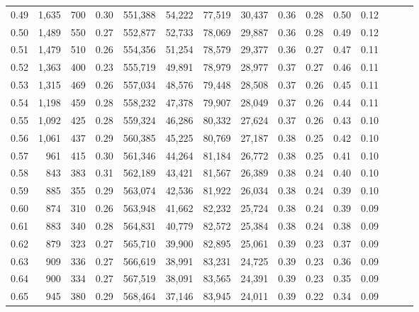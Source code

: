 \begin{tabular}{rrrrrrrrrrrrrrr}
0.49 &   1,635 &    700 &  0.30 &  551,388 &   54,222 &   77,519 &   30,437 &  0.36 &  0.28 &  0.50 &      0.12 \\
0.50 &   1,489 &    550 &  0.27 &  552,877 &   52,733 &   78,069 &   29,887 &  0.36 &  0.28 &  0.49 &      0.12 \\
0.51 &   1,479 &    510 &  0.26 &  554,356 &   51,254 &   78,579 &   29,377 &  0.36 &  0.27 &  0.47 &      0.11 \\
0.52 &   1,363 &    400 &  0.23 &  555,719 &   49,891 &   78,979 &   28,977 &  0.37 &  0.27 &  0.46 &      0.11 \\
0.53 &   1,315 &    469 &  0.26 &  557,034 &   48,576 &   79,448 &   28,508 &  0.37 &  0.26 &  0.45 &      0.11 \\
0.54 &   1,198 &    459 &  0.28 &  558,232 &   47,378 &   79,907 &   28,049 &  0.37 &  0.26 &  0.44 &      0.11 \\
0.55 &   1,092 &    425 &  0.28 &  559,324 &   46,286 &   80,332 &   27,624 &  0.37 &  0.26 &  0.43 &      0.10 \\
0.56 &   1,061 &    437 &  0.29 &  560,385 &   45,225 &   80,769 &   27,187 &  0.38 &  0.25 &  0.42 &      0.10 \\
0.57 &     961 &    415 &  0.30 &  561,346 &   44,264 &   81,184 &   26,772 &  0.38 &  0.25 &  0.41 &      0.10 \\
0.58 &     843 &    383 &  0.31 &  562,189 &   43,421 &   81,567 &   26,389 &  0.38 &  0.24 &  0.40 &      0.10 \\
0.59 &     885 &    355 &  0.29 &  563,074 &   42,536 &   81,922 &   26,034 &  0.38 &  0.24 &  0.39 &      0.10 \\
0.60 &     874 &    310 &  0.26 &  563,948 &   41,662 &   82,232 &   25,724 &  0.38 &  0.24 &  0.39 &      0.09 \\
0.61 &     883 &    340 &  0.28 &  564,831 &   40,779 &   82,572 &   25,384 &  0.38 &  0.24 &  0.38 &      0.09 \\
0.62 &     879 &    323 &  0.27 &  565,710 &   39,900 &   82,895 &   25,061 &  0.39 &  0.23 &  0.37 &      0.09 \\
0.63 &     909 &    336 &  0.27 &  566,619 &   38,991 &   83,231 &   24,725 &  0.39 &  0.23 &  0.36 &      0.09 \\
0.64 &     900 &    334 &  0.27 &  567,519 &   38,091 &   83,565 &   24,391 &  0.39 &  0.23 &  0.35 &      0.09 \\
0.65 &     945 &    380 &  0.29 &  568,464 &   37,146 &   83,945 &   24,011 &  0.39 &  0.22 &  0.34 &      0.09 \\

\end{tabular}
